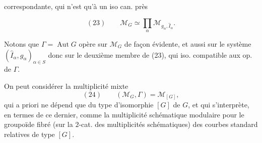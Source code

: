 \documentclass[11pt,a4paper]{article}
\begin{document}
correspondante, qui n'est qu'à un iso can. près

\[
(23)\qquad \mathcal{M}_{G} \simeq \prod_{\alpha} \mathcal{M}_{g_{\alpha}, \widehat{I}_{\alpha}} .
\]

Notons que $\Gamma = \operatorname{Aut} G$ opère sur $\mathcal{M}_{G}$ de façon évidente, et aussi sur le système $(\widehat{I}_{\alpha}, g_{\alpha})_{\alpha \in S}$ donc sur le deuxième membre de (23), qui   iso. compatible aux op. de $\Gamma$.

On peut considérer la multiplicité mixte
\[
(24)\qquad (\mathcal{M}_{G}, \Gamma) = \mathcal{M}_{[G]} ,
\]
qui a priori ne dépend que du type d'isomorphie $[G]$ de $G$, et qui s'interprète, en termes de ce dernier, comme la multiplicité schématique modulaire pour le groupoïde fibré (sur la $2$-cat. des multiplicités schématiques) des courbes standard relatives de type $[G]$.

\end{document}
